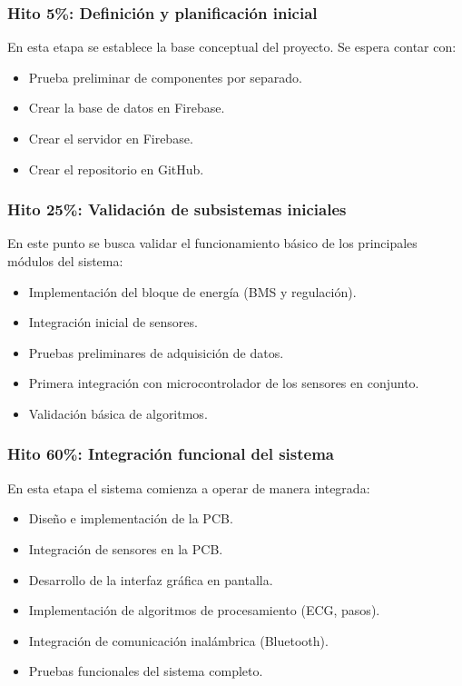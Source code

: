 \documentclass[letterpaper,11pt]{article}
\begin{document}
\subsubsection{Hito 5\%: Definición y planificación inicial}

En esta etapa se establece la base conceptual del proyecto. Se espera contar con:
\begin{itemize}
    \item Prueba preliminar de componentes por separado.
    \item Crear la base de datos en Firebase.
    \item Crear el servidor en Firebase.
    \item Crear el repositorio en GitHub.
\end{itemize}

\subsubsection{Hito 25\%: Validación de subsistemas iniciales}

En este punto se busca validar el funcionamiento básico de los principales módulos del sistema:
\begin{itemize}
    \item Implementación del bloque de energía (BMS y regulación).
    \item Integración inicial de sensores.
    \item Pruebas preliminares de adquisición de datos.
    \item Primera integración con microcontrolador de los sensores en conjunto.
    \item Validación básica de algoritmos.
\end{itemize}

\subsubsection{Hito 60\%: Integración funcional del sistema}

En esta etapa el sistema comienza a operar de manera integrada:
\begin{itemize}
    \item Diseño e implementación de la PCB.
    \item Integración de sensores en la PCB.
    \item Desarrollo de la interfaz gráfica en pantalla.
    \item Implementación de algoritmos de procesamiento (ECG, pasos).
    \item Integración de comunicación inalámbrica (Bluetooth).
    \item Pruebas funcionales del sistema completo.
\end{itemize}
\end{document}
